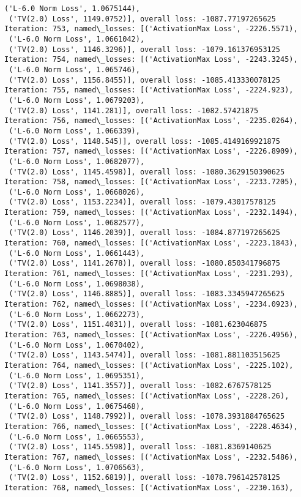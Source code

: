 \documentclass[10pt]{article}
\begin{document}
\begin{Verbatim}[commandchars=\\\{\}]
 ('L-6.0 Norm Loss', 1.0675144),
 ('TV(2.0) Loss', 1149.0752)], overall loss: -1087.77197265625
Iteration: 753, named\_losses: [('ActivationMax Loss', -2226.5571),
 ('L-6.0 Norm Loss', 1.0661042),
 ('TV(2.0) Loss', 1146.3296)], overall loss: -1079.161376953125
Iteration: 754, named\_losses: [('ActivationMax Loss', -2243.3245),
 ('L-6.0 Norm Loss', 1.065746),
 ('TV(2.0) Loss', 1156.8455)], overall loss: -1085.413330078125
Iteration: 755, named\_losses: [('ActivationMax Loss', -2224.923),
 ('L-6.0 Norm Loss', 1.0679203),
 ('TV(2.0) Loss', 1141.281)], overall loss: -1082.57421875
Iteration: 756, named\_losses: [('ActivationMax Loss', -2235.0264),
 ('L-6.0 Norm Loss', 1.066339),
 ('TV(2.0) Loss', 1148.545)], overall loss: -1085.4149169921875
Iteration: 757, named\_losses: [('ActivationMax Loss', -2226.8909),
 ('L-6.0 Norm Loss', 1.0682077),
 ('TV(2.0) Loss', 1145.4598)], overall loss: -1080.3629150390625
Iteration: 758, named\_losses: [('ActivationMax Loss', -2233.7205),
 ('L-6.0 Norm Loss', 1.0668026),
 ('TV(2.0) Loss', 1153.2234)], overall loss: -1079.43017578125
Iteration: 759, named\_losses: [('ActivationMax Loss', -2232.1494),
 ('L-6.0 Norm Loss', 1.0682577),
 ('TV(2.0) Loss', 1146.2039)], overall loss: -1084.877197265625
Iteration: 760, named\_losses: [('ActivationMax Loss', -2223.1843),
 ('L-6.0 Norm Loss', 1.0661443),
 ('TV(2.0) Loss', 1141.2678)], overall loss: -1080.850341796875
Iteration: 761, named\_losses: [('ActivationMax Loss', -2231.293),
 ('L-6.0 Norm Loss', 1.0698038),
 ('TV(2.0) Loss', 1146.8885)], overall loss: -1083.3345947265625
Iteration: 762, named\_losses: [('ActivationMax Loss', -2234.0923),
 ('L-6.0 Norm Loss', 1.0662273),
 ('TV(2.0) Loss', 1151.4031)], overall loss: -1081.623046875
Iteration: 763, named\_losses: [('ActivationMax Loss', -2226.4956),
 ('L-6.0 Norm Loss', 1.0670402),
 ('TV(2.0) Loss', 1143.5474)], overall loss: -1081.881103515625
Iteration: 764, named\_losses: [('ActivationMax Loss', -2225.102),
 ('L-6.0 Norm Loss', 1.0695351),
 ('TV(2.0) Loss', 1141.3557)], overall loss: -1082.6767578125
Iteration: 765, named\_losses: [('ActivationMax Loss', -2228.26),
 ('L-6.0 Norm Loss', 1.0675468),
 ('TV(2.0) Loss', 1148.7992)], overall loss: -1078.3931884765625
Iteration: 766, named\_losses: [('ActivationMax Loss', -2228.4634),
 ('L-6.0 Norm Loss', 1.0665553),
 ('TV(2.0) Loss', 1145.5598)], overall loss: -1081.8369140625
Iteration: 767, named\_losses: [('ActivationMax Loss', -2232.5486),
 ('L-6.0 Norm Loss', 1.0706563),
 ('TV(2.0) Loss', 1152.6819)], overall loss: -1078.796142578125
Iteration: 768, named\_losses: [('ActivationMax Loss', -2230.163),

\end{Verbatim}
\end{document}
